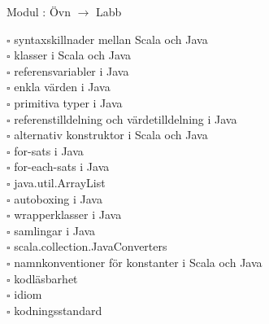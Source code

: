 
    Modul : Övn  $\rightarrow$ Labb 
    \begin{multicols}{3}\SlideFontTiny
    $\square$ syntaxskillnader mellan Scala och Java \\
$\square$ klasser i Scala och Java \\
$\square$ referensvariabler i Java \\
$\square$ enkla värden i Java \\
$\square$ primitiva typer i Java \\
$\square$ referenstilldelning och värdetilldelning i Java \\
$\square$ alternativ konstruktor i Scala och Java \\
$\square$ for-sats i Java \\
$\square$ for-each-sats i Java \\
$\square$ java.util.ArrayList \\
$\square$ autoboxing i Java \\
$\square$ wrapperklasser i Java \\
$\square$ samlingar i Java \\
$\square$ scala.collection.JavaConverters \\
$\square$ namnkonventioner för konstanter i Scala och Java \\
$\square$ kodläsbarhet \\
$\square$ idiom \\
$\square$ kodningsstandard \\
    \end{multicols}
    